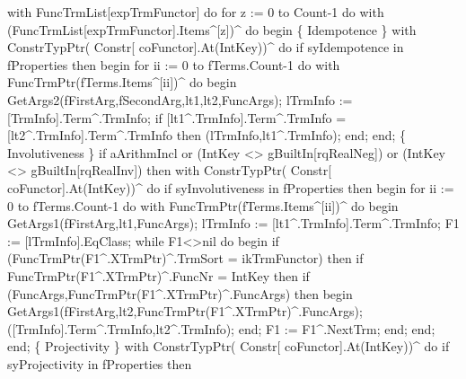       with FuncTrmList[expTrmFunctor] do
         for z := 0 to Count-1 do
            with (FuncTrmList[expTrmFunctor].Items^[z])^ do
         begin
            \{ Idempotence \}
            with ConstrTypPtr( Constr[ coFunctor].At(IntKey))^ do
               if syIdempotence in fProperties then
               begin
                  for ii := 0 to fTerms.Count-1 do
                     with FuncTrmPtr(fTerms.Items^[ii])^ do
                  begin
                     GetArgs2(fFirstArg,fSecondArg,lt1,lt2,FuncArgs);
                     lTrmInfo := [TrmInfo].Term^.TrmInfo;
                     if [lt1^.TrmInfo].Term^.TrmInfo = [lt2^.TrmInfo].Term^.TrmInfo
                     then (lTrmInfo,lt1^.TrmInfo);
                  end;
               end;
            \{ Involutiveness \}
            if aArithmIncl or (IntKey <> gBuiltIn[rqRealNeg])
               or (IntKey <> gBuiltIn[rqRealInv]) then
               with ConstrTypPtr( Constr[ coFunctor].At(IntKey))^ do
                  if syInvolutiveness in fProperties then
                  begin
                     for ii := 0 to fTerms.Count-1 do
                        with FuncTrmPtr(fTerms.Items^[ii])^ do
                     begin
                        GetArgs1(fFirstArg,lt1,FuncArgs);
                        lTrmInfo := [lt1^.TrmInfo].Term^.TrmInfo;
                        F1 := [lTrmInfo].EqClass;
                        while F1<>nil do
                        begin
                           if (FuncTrmPtr(F1^.XTrmPtr)^.TrmSort = ikTrmFunctor) then
                              if FuncTrmPtr(F1^.XTrmPtr)^.FuncNr = IntKey then
                                 if (FuncArgs,FuncTrmPtr(F1^.XTrmPtr)^.FuncArgs) then
                                 begin
                                    GetArgs1(fFirstArg,lt2,FuncTrmPtr(F1^.XTrmPtr)^.FuncArgs);
                                    ([TrmInfo].Term^.TrmInfo,lt2^.TrmInfo);
                                 end;
                           F1 := F1^.NextTrm;
                        end;
                     end;
                  end;
            \{ Projectivity \}
            with ConstrTypPtr( Constr[ coFunctor].At(IntKey))^ do
               if syProjectivity in fProperties then
